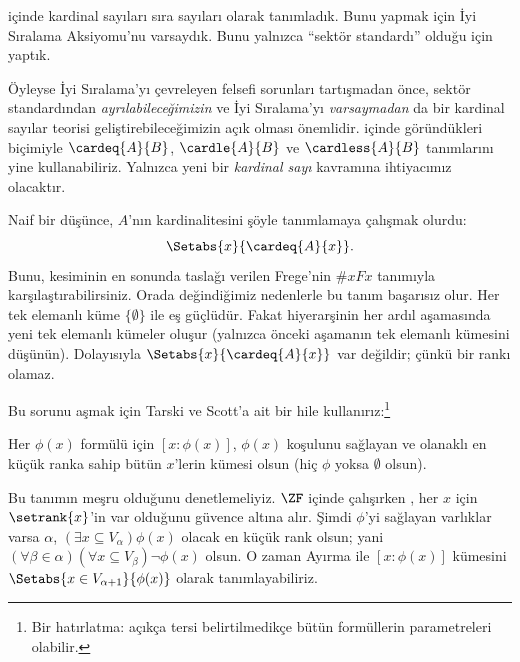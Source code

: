 


 içinde kardinal
sayıları sıra sayıları olarak tanımladık. Bunu yapmak için İyi Sıralama
Aksiyomu'nu varsaydık. Bunu yalnızca ``sektör standardı'' olduğu için
yaptık.

Öyleyse İyi Sıralama'yı çevreleyen felsefi sorunları tartışmadan önce,
sektör standardından \emph{ayrılabileceğimizin} ve İyi Sıralama'yı
\emph{varsaymadan} da bir kardinal sayılar teorisi geliştirebileceğimizin
açık olması önemlidir.
 içinde göründükleri biçimiyle
$\cardeq{A}{B}$, $\cardle{A}{B}$ ve $\cardless{A}{B}$ tanımlarını yine
kullanabiliriz. Yalnızca yeni bir \emph{kardinal sayı} kavramına
ihtiyacımız olacaktır.

Naif bir düşünce, $A$'nın kardinalitesini şöyle tanımlamaya çalışmak olurdu:
\[
	\Setabs{x}{\cardeq{A}{x}}.
\]
Bunu,  kesiminin en sonunda taslağı verilen
Frege'nin $\# x Fx$ tanımıyla karşılaştırabilirsiniz. Orada değindiğimiz
nedenlerle bu tanım başarısız olur. Her tek elemanlı küme
$\{\emptyset\}$ ile eş güçlüdür. Fakat hiyerarşinin her ardıl aşamasında
yeni tek elemanlı kümeler oluşur (yalnızca önceki aşamanın tek elemanlı
kümesini düşünün). Dolayısıyla
$\Setabs{x}{\cardeq{A}{x}}$ var değildir; çünkü bir rankı olamaz.

Bu sorunu aşmak için Tarski ve Scott'a ait bir hile kullanırız:\footnote{Bir
hatırlatma: açıkça tersi belirtilmedikçe bütün formüllerin parametreleri
olabilir.}

\begin{defn}
Her $\phi(x)$ formülü için $[x:\phi(x)]$, $\phi(x)$ koşulunu sağlayan ve
olanaklı en küçük ranka sahip bütün $x$'lerin kümesi olsun (hiç $\phi$
yoksa $\emptyset$ olsun).
\end{defn}

Bu tanımın meşru olduğunu denetlemeliyiz. $\ZF$ içinde çalışırken
, her $x$ için
$\setrank{x}$'in var olduğunu güvence altına alır. Şimdi $\phi$'yi sağlayan
varlıklar varsa $\alpha$, $(\exists x\subseteq V_\alpha)\phi(x)$ olacak en
küçük rank olsun; yani
$(\forall\beta\in\alpha)(\forall x\subseteq V_\beta)\lnot\phi(x)$ olsun.
O zaman Ayırma ile $[x:\phi(x)]$ kümesini
$\Setabs{x\in V_{\alpha+1}}{\phi(x)}$ olarak tanımlayabiliriz.

